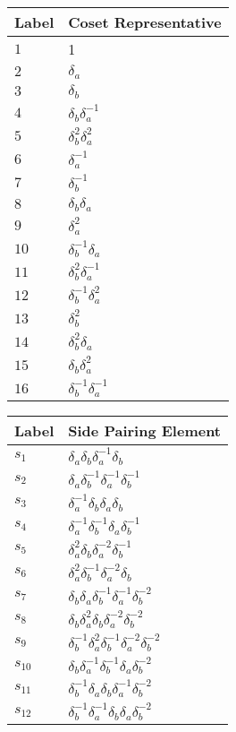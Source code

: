 \documentclass{article}
\begin{document}
\begin{center}
\begin{tabular}{ll}
\toprule
Label & Coset Representative\\
\midrule
$1$ & 1 \\
$2$ & $\delta_a^{}$ \\
$3$ & $\delta_b^{}$ \\
$4$ & $\delta_b^{}\delta_a^{-1}$ \\
$5$ & $\delta_b^{2}\delta_a^{2}$ \\
$6$ & $\delta_a^{-1}$ \\
$7$ & $\delta_b^{-1}$ \\
$8$ & $\delta_b^{}\delta_a^{}$ \\
$9$ & $\delta_a^{2}$ \\
$10$ & $\delta_b^{-1}\delta_a^{}$ \\
$11$ & $\delta_b^{2}\delta_a^{-1}$ \\
$12$ & $\delta_b^{-1}\delta_a^{2}$ \\
$13$ & $\delta_b^{2}$ \\
$14$ & $\delta_b^{2}\delta_a^{}$ \\
$15$ & $\delta_b^{}\delta_a^{2}$ \\
$16$ & $\delta_b^{-1}\delta_a^{-1}$ \\
\bottomrule
\end{tabular}
\hfill
\begin{tabular}{ll}
\toprule
Label & Side Pairing Element\\
\midrule
$s_{1}$ & $\delta_a^{}\delta_b^{}\delta_a^{-1}\delta_b^{}$ \\
$s_{2}$ & $\delta_a^{}\delta_b^{-1}\delta_a^{-1}\delta_b^{-1}$ \\
$s_{3}$ & $\delta_a^{-1}\delta_b^{}\delta_a^{}\delta_b^{}$ \\
$s_{4}$ & $\delta_a^{-1}\delta_b^{-1}\delta_a^{}\delta_b^{-1}$ \\
$s_{5}$ & $\delta_a^{2}\delta_b^{}\delta_a^{-2}\delta_b^{-1}$ \\
$s_{6}$ & $\delta_a^{2}\delta_b^{-1}\delta_a^{-2}\delta_b^{}$ \\
$s_{7}$ & $\delta_b^{}\delta_a^{}\delta_b^{-1}\delta_a^{-1}\delta_b^{-2}$ \\
$s_{8}$ & $\delta_b^{}\delta_a^{2}\delta_b^{}\delta_a^{-2}\delta_b^{-2}$ \\
$s_{9}$ & $\delta_b^{-1}\delta_a^{2}\delta_b^{-1}\delta_a^{-2}\delta_b^{-2}$ \\
$s_{10}$ & $\delta_b^{}\delta_a^{-1}\delta_b^{-1}\delta_a^{}\delta_b^{-2}$ \\
$s_{11}$ & $\delta_b^{-1}\delta_a^{}\delta_b^{}\delta_a^{-1}\delta_b^{-2}$ \\
$s_{12}$ & $\delta_b^{-1}\delta_a^{-1}\delta_b^{}\delta_a^{}\delta_b^{-2}$ \\
\bottomrule
\end{tabular}
\end{center}

\thispagestyle{empty}
\end{document}
